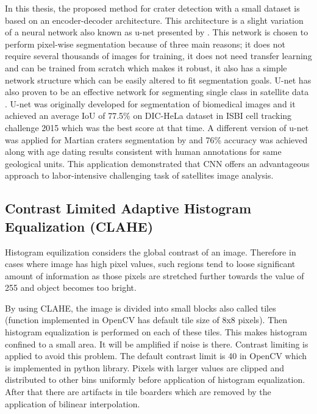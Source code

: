 \documentclass[11pt]{article}
\begin{document}
In this thesis, the proposed method for crater detection with a small dataset is based on an encoder-decoder architecture. This architecture is a slight variation of a neural network also known as u-net presented by \cite{ronneberger2015u}. This network is chosen to perform pixel-wise segmentation because of three main reasons; it does not require several thousands of images for training, it does not need transfer learning and can be trained from scratch which makes it robust, it also has a simple network structure which can be easily altered to fit segmentation goals. U-net has also proven to be an effective network for segmenting single class in satellite data \cite{Snuverink2017}. U-net was originally developed for segmentation of biomedical images and it achieved an average IoU of 77.5\% on DIC-HeLa dataset in ISBI cell tracking challenge 2015 which was the best score at that time. A different version of u-net was applied for Martian craters segmentation by \cite{delatte2019segmentation} and 76\% accuracy was achieved along with age dating results consistent with human annotations for same geological units. This application demonstrated that CNN offers an advantageous approach to labor-intensive challenging task of satellites image analysis. 

\subsection{Contrast Limited Adaptive Histogram Equalization (CLAHE)}
Histogram equilization considers the global contrast of an image. Therefore in cases where image has high pixel values, such regions tend to loose significant amount of information as those pixels are stretched further towards the value of 255 and object becomes too bright. 

By using CLAHE, the image is divided into small blocks also called tiles (function implemented in OpenCV has default tile size of 8x8 pixels). Then histogram equalization is performed on each of these tiles. This makes histogram confined to a small area. It will be amplified if noise is there. Contrast limiting is applied to avoid this problem. The default contrast limit is 40 in OpenCV which is implemented in python library. Pixels with larger values are clipped and distributed to other bins uniformly before application of histogram equalization. After that there are artifacts in tile boarders which are removed by the application of bilinear interpolation.
\end{document}
